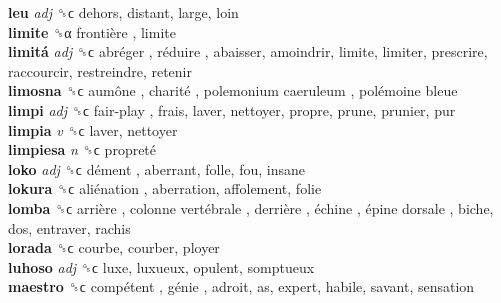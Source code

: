 \textbf{leu} \emph{adj}  ␝ϲ  dehors, distant, large, loin  \\
\textbf{limite} ␝α   frontière , limite  \\
\textbf{limitá} \emph{adj}  ␝ϲ   abréger ,  réduire , abaisser, amoindrir, limite, limiter, prescrire, raccourcir, restreindre, retenir  \\
\textbf{limosna} ␝ϲ   aumône ,  charité ,  polemonium caeruleum ,  polémoine bleue   \\
\textbf{limpi} \emph{adj}  ␝ϲ   fair-play , frais, laver, nettoyer, propre, prune, prunier, pur  \\
\textbf{limpia} \emph{v}  ␝ϲ  laver, nettoyer  \\
\textbf{limpiesa} \emph{n}  ␝ϲ   propreté   \\
\textbf{loko} \emph{adj}  ␝ϲ   dément , aberrant, folle, fou, insane  \\
\textbf{lokura} ␝ϲ   aliénation , aberration, affolement, folie  \\
\textbf{lomba} ␝ϲ   arrière ,  colonne vertébrale ,  derrière ,  échine ,  épine dorsale , biche, dos, entraver, rachis  \\
\textbf{lorada} ␝ϲ  courbe, courber, ployer  \\
\textbf{luhoso} \emph{adj}  ␝ϲ  luxe, luxueux, opulent, somptueux  \\
\textbf{maestro} ␝ϲ   compétent ,  génie , adroit, as, expert, habile, savant, sensation  \\
